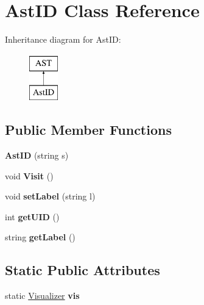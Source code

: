 \hypertarget{classAstID}{\section{Ast\-I\-D Class Reference}
\label{classAstID}
}
Inheritance diagram for Ast\-I\-D\-:\begin{figure}[H]
\begin{center}
\leavevmode
\includegraphics[height=2.000000cm]{classAstID}
\end{center}
\end{figure}
\subsection*{Public Member Functions}
\begin{DoxyCompactItemize}
\item 
\hypertarget{classAstID_a7ed2599dc08353ffeca9346ec7ea297f}{{\bfseries Ast\-I\-D} (string s)}\label{classAstID_a7ed2599dc08353ffeca9346ec7ea297f}

\item 
\hypertarget{classAstID_af84d100fc8e77d534362310f36855ad0}{void {\bfseries Visit} ()}\label{classAstID_af84d100fc8e77d534362310f36855ad0}

\item 
\hypertarget{classAST_a71d680856e95ff89f55d5311a552eba6}{void {\bfseries set\-Label} (string l)}\label{classAST_a71d680856e95ff89f55d5311a552eba6}

\item 
\hypertarget{classAST_ab7a5b1d9f1c2de0d98deb356f724a42c}{int {\bfseries get\-U\-I\-D} ()}\label{classAST_ab7a5b1d9f1c2de0d98deb356f724a42c}

\item 
\hypertarget{classAST_aee029be902fffc927d16ccb03eb922ad}{string {\bfseries get\-Label} ()}\label{classAST_aee029be902fffc927d16ccb03eb922ad}

\end{DoxyCompactItemize}
\subsection*{Static Public Attributes}
\begin{DoxyCompactItemize}
\item 
\hypertarget{classAST_aca9e6637209b31e03a09c0d42f29bdfa}{static \hyperlink{classVisualizer}{Visualizer} {\bfseries vis}}\label{classAST_aca9e6637209b31e03a09c0d42f29bdfa}

\end{DoxyCompactItemize}
